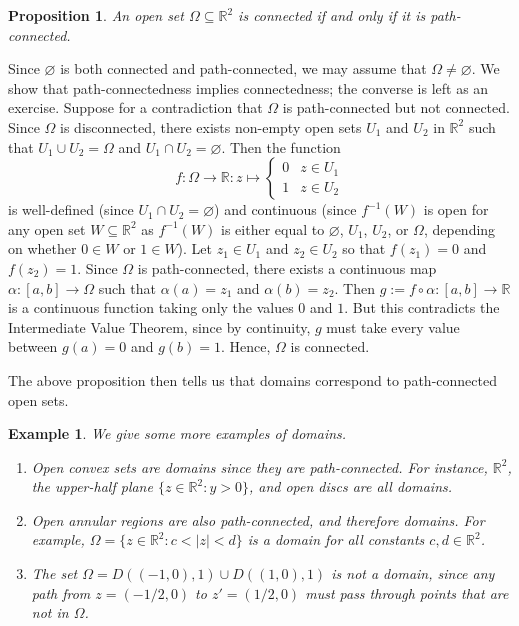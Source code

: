 \documentclass[10pt]{article}
\makeatletter
\newcommand{\R}{\mathbb{R}}
\theoremstyle{newstyle}
\newtheorem{prop}[thm]{Proposition}
\newtheorem{exmp}[thm]{Example}
\newenvironment{pf}[1][\proofname]{\par
  \pushQED{\qed}%
  \normalfont \topsep0\p@\relax
  \trivlist
  \item[\hskip\labelsep\scshape
  #1\@addpunct{.}]\ignorespaces
}{%
  \popQED\endtrivlist\@endpefalse
}
\makeatother
\begin{document}
\begin{prop}
An open set $\Omega \subseteq \R^2$ is connected if and only if it is path-connected.
\end{prop}
\begin{pf}
Since $\varnothing$ is both connected and path-connected, we may assume that $\Omega \neq \varnothing$. 
We show that path-connectedness implies connectedness; the converse is left as an exercise. 
Suppose for a contradiction that $\Omega$ is path-connected but not connected. Since $\Omega$ is 
disconnected, there exists non-empty open sets $U_1$ and $U_2$ in $\R^2$ such that $U_1 \cup U_2 = \Omega$ 
and $U_1 \cap U_2 = \varnothing$. Then the function 
\[ f : \Omega \to \R : z \mapsto \begin{cases} 0 & z \in U_1 \\ 1 & z \in U_2 \end{cases} \]
is well-defined (since $U_1 \cap U_2 = \varnothing$) and continuous (since $f^{-1}(W)$ is open for 
any open set $W \subseteq \R^2$ as $f^{-1}(W)$ is either equal to $\varnothing$, $U_1$, $U_2$, 
or $\Omega$, depending on whether $0 \in W$ or $1 \in W$). Let $z_1 \in U_1$ and $z_2 \in U_2$ 
so that $f(z_1) = 0$ and $f(z_2) = 1$. Since $\Omega$ is path-connected, there exists a continuous 
map $\alpha : [a, b] \to \Omega$ such that $\alpha(a) = z_1$ and $\alpha(b) = z_2$. 
Then $g := f \circ \alpha : [a, b] \to \R$ is a continuous function taking only the values $0$ and $1$. 
But this contradicts the Intermediate Value Theorem, since by continuity, $g$ must take every 
value between $g(a) = 0$ and $g(b) = 1$. Hence, $\Omega$ is connected.
\end{pf}

The above proposition then tells us that domains correspond to path-connected open sets.

\begin{exmp}
We give some more examples of domains.
\begin{enumerate}[(1)]
    \item Open convex sets are domains since they are path-connected. For instance, 
    $\R^2$, the upper-half plane $\{z \in \R^2 : y > 0\}$, and open discs are all domains.
    \item Open annular regions are also path-connected, and therefore domains. 
    For example, $\Omega = \{z \in \R^2 : c < |z| < d\}$ is a domain for all constants $c, d \in \R^2$.
    \item The set $\Omega = D((-1, 0), 1) \cup D((1, 0), 1)$ is {\it not} a domain, since any 
    path from $z = (-1/2, 0)$ to $z' = (1/2, 0)$ must pass through points that are not in $\Omega$.
\end{enumerate}
\end{exmp}
\end{document}
